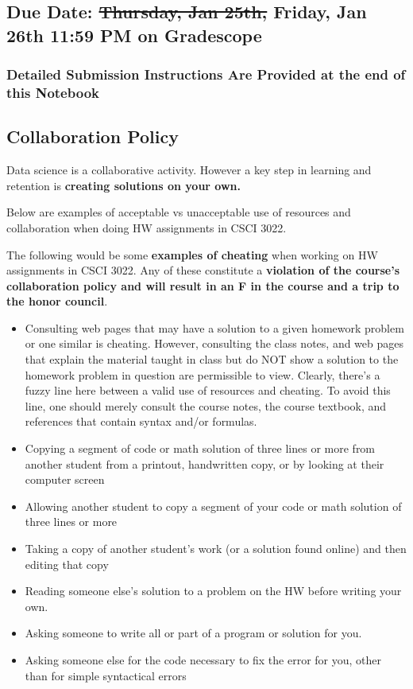 \documentclass[11pt]{article}
\providecommand{\tightlist}{%
      \setlength{\itemsep}{0pt}\setlength{\parskip}{0pt}}
\begin{document}
\subsection{\texorpdfstring{Due Date: \st{Thursday, Jan 25th,} Friday,
Jan 26th 11:59 PM on
Gradescope}{Due Date: Thursday, Jan 25th, Friday, Jan 26th 11:59 PM on Gradescope}}\label{due-date-thursday-jan-25th-friday-jan-26th-1159-pm-on-gradescope}

\subsubsection{Detailed Submission Instructions Are Provided at the end
of this
Notebook}\label{detailed-submission-instructions-are-provided-at-the-end-of-this-notebook}

\subsection{Collaboration Policy}\label{collaboration-policy}

Data science is a collaborative activity. However a key step in learning
and retention is \textbf{creating solutions on your own.}

Below are examples of acceptable vs unacceptable use of resources and
collaboration when doing HW assignments in CSCI 3022.

The following would be some \textbf{examples of cheating} when working
on HW assignments in CSCI 3022. Any of these constitute a
\textbf{violation of the course's collaboration policy and will result
in an F in the course and a trip to the honor council}.

\begin{itemize}
\tightlist
\item
  Consulting web pages that may have a solution to a given homework
  problem or one similar is cheating. However, consulting the class
  notes, and web pages that explain the material taught in class but do
  NOT show a solution to the homework problem in question are
  permissible to view. Clearly, there's a fuzzy line here between a
  valid use of resources and cheating. To avoid this line, one should
  merely consult the course notes, the course textbook, and references
  that contain syntax and/or formulas.
\item
  Copying a segment of code or math solution of three lines or more from
  another student from a printout, handwritten copy, or by looking at
  their computer screen
\item
  Allowing another student to copy a segment of your code or math
  solution of three lines or more
\item
  Taking a copy of another student's work (or a solution found online)
  and then editing that copy
\item
  Reading someone else's solution to a problem on the HW before writing
  your own.
\item
  Asking someone to write all or part of a program or solution for you.
\item
  Asking someone else for the code necessary to fix the error for you,
  other than for simple syntactical errors
\end{itemize}
\end{document}
